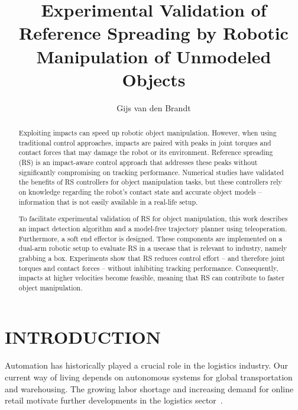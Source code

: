 \documentclass[a4paper, 10pt, conference]{ieeeconf}
\title{\LARGE \bf
    Experimental Validation of Reference Spreading by Robotic Manipulation of Unmodeled Objects
    }
\author{Gijs van den Brandt%
    }
\begin{document}
    \maketitle
    \thispagestyle{empty}
    \pagestyle{empty}

    \begin{abstract}

    Exploiting impacts can speed up robotic object manipulation.  However,  when using traditional control approaches, impacts are paired with peaks in joint torques and contact forces that may damage the robot or its environment. Reference spreading (RS) is an impact-aware control approach that addresses these peaks without significantly compromising on tracking performance. Numerical studies have validated the benefits of RS controllers for object manipulation tasks, but these controllers rely on knowledge regarding the robot's contact state and accurate object models --  information that is not easily available in a real-life setup. 

    To facilitate experimental validation of RS for object manipulation, this work describes an impact detection algorithm and a model-free trajectory planner using teleoperation. Furthermore, a soft end effector is designed. These components are implemented on a dual-arm robotic setup to evaluate RS in a usecase that is relevant to industry, namely grabbing a box. Experiments show that RS reduces control effort -- and therefore joint torques and contact forces -- without inhibiting tracking performance. Consequently, impacts at higher velocities become feasible, meaning that RS can contribute to faster object manipulation.

    \end{abstract}

    \section{INTRODUCTION}

    Automation has historically played a crucial role in the logistics industry. Our current way of living depends on autonomous systems for global transportation and warehousing. The growing labor shortage and increasing demand for online retail motivate further developments in the logistics sector~\cite{dekhneAutomationLogisticsBig2019}.

\end{document}
